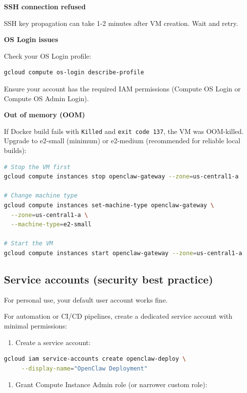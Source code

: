 \textbf{SSH connection refused}

SSH key propagation can take 1-2 minutes after VM creation. Wait and retry.

\textbf{OS Login issues}

Check your OS Login profile:

\begin{lstlisting}[language=bash]
gcloud compute os-login describe-profile
\end{lstlisting}


Ensure your account has the required IAM permissions (Compute OS Login or Compute OS Admin Login).

\textbf{Out of memory (OOM)}

If Docker build fails with \texttt{Killed} and \texttt{exit code 137}, the VM was OOM-killed. Upgrade to e2-small (minimum) or e2-medium (recommended for reliable local builds):

\begin{lstlisting}[language=bash]
# Stop the VM first
gcloud compute instances stop openclaw-gateway --zone=us-central1-a

# Change machine type
gcloud compute instances set-machine-type openclaw-gateway \
  --zone=us-central1-a \
  --machine-type=e2-small

# Start the VM
gcloud compute instances start openclaw-gateway --zone=us-central1-a
\end{lstlisting}


\hrulefill


\subsection{Service accounts (security best practice)}


For personal use, your default user account works fine.

For automation or CI/CD pipelines, create a dedicated service account with minimal permissions:

\begin{enumerate}
  \item Create a service account:
\end{enumerate}


\begin{lstlisting}[language=bash]
   gcloud iam service-accounts create openclaw-deploy \
     --display-name="OpenClaw Deployment"
\end{lstlisting}


\begin{enumerate}
  \item Grant Compute Instance Admin role (or narrower custom role):
\end{enumerate}


